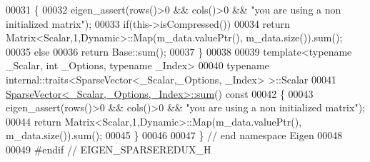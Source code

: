 \begin{DoxyCode}
00031 \textcolor{keyword}{}\{
00032   eigen\_assert(rows()>0 && cols()>0 && \textcolor{stringliteral}{"you are using a non initialized matrix"});
00033   \textcolor{keywordflow}{if}(this->isCompressed())
00034     \textcolor{keywordflow}{return} Matrix<Scalar,1,Dynamic>::Map(m\_data.valuePtr(), m\_data.size()).sum();
00035   \textcolor{keywordflow}{else}
00036     \textcolor{keywordflow}{return} Base::sum();
00037 \}
00038 
00039 \textcolor{keyword}{template}<\textcolor{keyword}{typename} \_Scalar, \textcolor{keywordtype}{int} \_Options, \textcolor{keyword}{typename} \_Index>
00040 \textcolor{keyword}{typename} internal::traits<SparseVector<\_Scalar,\_Options, \_Index> >::Scalar
00041 \hyperlink{group___sparse_core___module_a05e8aff0ba5c4dd4ab69e173d80d1a68}{SparseVector<\_Scalar,\_Options,\_Index>::sum}()\textcolor{keyword}{ const}
00042 \textcolor{keyword}{}\{
00043   eigen\_assert(rows()>0 && cols()>0 && \textcolor{stringliteral}{"you are using a non initialized matrix"});
00044   \textcolor{keywordflow}{return} Matrix<Scalar,1,Dynamic>::Map(m\_data.valuePtr(), m\_data.size()).sum();
00045 \}
00046 
00047 \} \textcolor{comment}{// end namespace Eigen}
00048 
00049 \textcolor{preprocessor}{#endif // EIGEN\_SPARSEREDUX\_H}
\end{DoxyCode}
